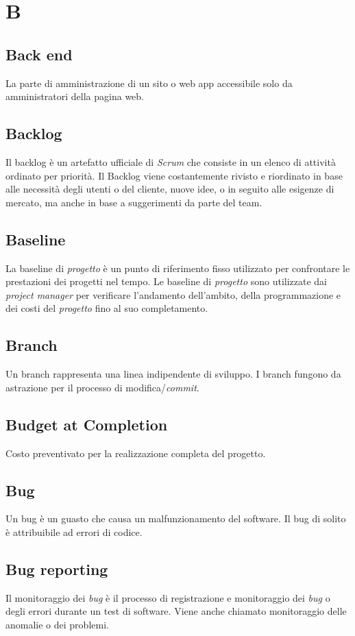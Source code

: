\chapter{B}

\section{Back end}\label{sec:Back-end}
La parte di amministrazione di un sito o web app accessibile solo da amministratori della pagina web.

\section{Backlog}
Il backlog è un artefatto ufficiale di \emph{Scrum} che consiste in un elenco di attività ordinato per priorità. Il Backlog viene costantemente rivisto e riordinato in base alle necessità degli utenti o del cliente, nuove idee, o in seguito alle esigenze di mercato, ma anche in base a suggerimenti da parte del team.

\section{Baseline}
La baseline di \emph{progetto} è un punto di riferimento fisso utilizzato per confrontare le prestazioni dei progetti nel tempo. Le baseline di \emph{progetto} sono utilizzate dai \emph{project manager} per verificare l'andamento dell'ambito, della programmazione e dei costi del \emph{progetto} fino al suo completamento.

\section{Branch}
Un branch rappresenta una linea indipendente di sviluppo. I branch fungono da astrazione per il processo di modifica/\emph{commit}.

\section{Budget at Completion}
Costo preventivato per la realizzazione completa del progetto.

\section{Bug}\label{sec:Bugs}
Un bug è un guasto che causa un malfunzionamento del software. Il bug di solito è attribuibile ad errori di codice.

\section{Bug reporting}
Il monitoraggio dei \emph{bug} è il processo di registrazione e monitoraggio dei \emph{bug} o degli errori durante un test di software. Viene anche chiamato monitoraggio delle anomalie o dei problemi.
